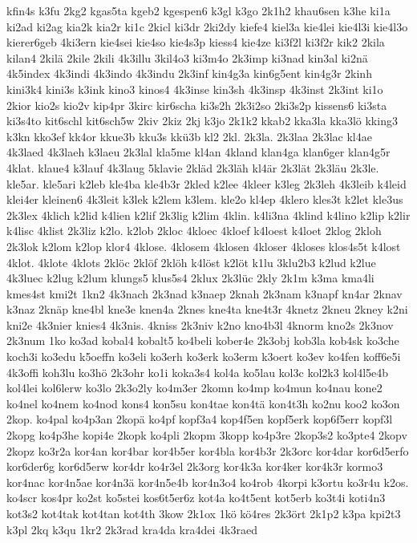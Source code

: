 {kfin4s
k3fu
2kg2
kgas5ta
kgeb2
kgespen6
k3gl
k3go
2k1h2
khau6sen
k3he
ki1a
ki2ad
ki2ag
kia2k
kia2r
ki1c
2kicl
ki3dr
2ki2dy
kiefe4
kiel3a
kie4lei
kie4l3i
kie4l3o
kierer6geb
4ki3ern
kie4sei
kie4so
kie4s3p
kiess4
kie4ze
ki3f2l
ki3f2r
kik2
2kila
kilan4
2kilä
2kile
2kili
4k3illu
3kil4o3
ki3m4o
2k3imp
ki3nad
kin3al
ki2nä
4k5index
4k3indi
4k3indo
4k3indu
2k3inf
kin4g3a
kin6g5ent
kin4g3r
2kinh
kini3k4
kini3s
k3ink
kino3
kinos4
4k3inse
kin3sh
4k3insp
4k3inst
2k3int
ki1o
2kior
kio2s
kio2v
kip4pr
3kirc
kir6scha
ki3s2h
2k3i2so
2ki3s2p
kissens6
ki3sta
ki3s4to
kit6schl
kit6sch5w
2kiv
2kiz
2kj
k3jo
2k1k2
kkab2
kka3la
kka3lö
kking3
k3kn
kko3ef
kk4or
kkue3b
kku3s
kkü3b
kl2
2kl.
2k3la.
2k3laa
2k3lac
kl4ae
4k3laed
4k3laeh
k3laeu
2k3lal
kla5me
kl4an
4kland
klan4ga
klan6ger
klan4g5r
4klat.
klaue4
k3lauf
4k3laug
5klavie
2kläd
2k3läh
kl4är
2k3lät
2k3läu
2k3le.
kle5ar.
kle5ari
k2leb
kle4ba
kle4b3r
2kled
k2lee
4kleer
k3leg
2k3leh
4k3leib
k4leid
klei4er
kleinen6
4k3leit
k3lek
k2lem
k3lem.
kle2o
kl4ep
4klero
kles3t
k2let
kle3us
2k3lex
4klich
k2lid
k4lien
k2lif
2k3lig
k2lim
4klin.
k4li3na
4klind
k4lino
k2lip
k2lir
k4lisc
4klist
2k3liz
k2lo.
k2lob
2kloc
4kloec
4kloef
k4loest
k4loet
2klog
2kloh
2k3lok
k2lom
k2lop
klor4
4klose.
4klosem
4klosen
4kloser
4kloses
klos4s5t
k4lost
4klot.
4klote
4klots
2klöc
2klöf
2klöh
k4löst
k2löt
k1lu
3klu2b3
k2lud
k2lue
4k3luec
k2lug
k2lum
klungs5
klus5s4
2klux
2k3lüc
2kly
2k1m
k3ma
kma4li
kmes4st
kmi2t
1kn2
4k3nach
2k3nad
k3naep
2knah
2k3nam
k3napf
kn4ar
2knav
k3naz
2knäp
kne4bl
kne3e
knen4a
2knes
kne4ta
kne4t3r
4knetz
2kneu
2kney
k2ni
kni2e
4k3nier
knies4
4k3nis.
4kniss
2k3niv
k2no
kno4b3l
4knorm
kno2s
2k3nov
2k3num
1ko
ko3ad
kobal4
kobalt5
ko4beli
kober4e
2k3obj
kob3la
kob4sk
ko3che
koch3i
ko3edu
k5oeffn
ko3eli
ko3erh
ko3erk
ko3erm
k3oert
ko3ev
ko4fen
koff6e5i
4k3offi
koh3lu
ko3hö
2k3ohr
ko1i
koka3s4
kol4a
ko5lau
kol3c
kol2k3
kol4l5e4b
kol4lei
kol6lerw
ko3lo
2k3o2ly
ko4m3er
2komn
ko4mp
ko4mun
ko4nau
kone2
ko4nel
ko4nem
ko4nod
kons4
kon5su
kon4tae
kon4tä
kon4t3h
ko2nu
koo2
ko3on
2kop.
ko4pal
ko4p3an
2kopä
ko4pf
kopf3a4
kop4f5en
kopf5erk
kop6f5err
kopf3l
2kopg
ko4p3he
kopi4e
2kopk
ko4pli
2kopm
3kopp
ko4p3re
2kop3s2
ko3pte4
2kopv
2kopz
ko3r2a
kor4an
kor4bar
kor4b5er
kor4bla
kor4b3r
2k3orc
kor4dar
kor6d5erfo
kor6der6g
kor6d5erw
kor4dr
ko4r3el
2k3org
kor4k3a
kor4ker
kor4k3r
kormo3
kor4nac
kor4n5ae
kor4n3ä
kor4n5e4b
kor4n3o4
ko4rob
4korpi
k3ortu
ko3r4u
k2os.
ko4scr
kos4pr
ko2st
ko5stei
kos6t5er6z
kot4a
ko4t5ent
kot5erb
ko3t4i
koti4n3
kot3s2
kot4tak
kot4tan
kot4th
3kow
2k1ox
1kö
kö4res
2k3ört
2k1p2
k3pa
kpi2t3
k3pl
2kq
k3qu
1kr2
2k3rad
kra4da
kra4dei
4k3raed
}
